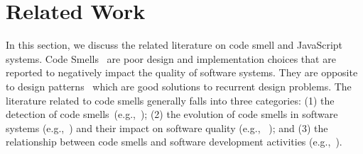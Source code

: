 \section{Related Work}\label{sec:related}
\begin{sloppypar}
In this section, we discuss the related literature on code smell and JavaScript systems.
Code Smells~\cite{fowler1997refactoring} are poor design and implementation choices that are reported to negatively impact the quality of software systems. They are opposite to design patterns~\cite{Gam95} which are good solutions to recurrent design problems.
The literature related to code smells generally falls into three categories: (1) the detection of code smells~(e.g.,~\cite{Khomh11-BGB,fard2013jsnose}); (2) the evolution of code smells in software systems (e.g.,~\cite{chatzigeorgiou2010investigating,CodeSmells_overtime,peters2012evaluating,tufano2015and}) and their impact on software quality (e.g., ~\cite{shatnawi2006investigation,khomh2012exploratory,Abbes11,jaafar2013mining,tufano2015and});
and (3) the relationship between code smells and software development activities (e.g.,~\cite{Sjoberg13QEC,Abbes11}).


\end{sloppypar}
